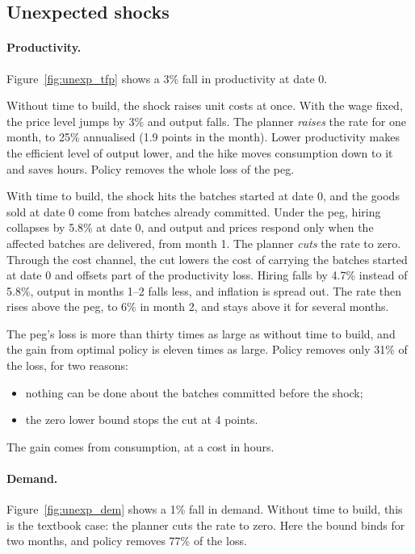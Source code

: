 \documentclass[11pt]{article}
\theoremstyle{definition}
\begin{document}
\subsection{Unexpected shocks}\label{sec:unexp}

\paragraph{Productivity.} Figure~\ref{fig:unexp_tfp} shows a 3\% fall in productivity at date 0.

Without time to build, the shock raises unit costs at once. With the wage fixed, the price level jumps
by 3\% and output falls. The planner \emph{raises} the rate for one month, to 25\% annualised (1.9
points in the month). Lower productivity makes the efficient level of output lower, and the hike moves
consumption down to it and saves hours. Policy removes the whole loss of the peg.

With time to build, the shock hits the batches started at date 0, and the goods sold at date 0 come
from batches already committed. Under the peg, hiring collapses by 5.8\% at date 0, and output and
prices respond only when the affected batches are delivered, from month 1. The planner \emph{cuts}
the rate to zero. Through the cost channel, the cut lowers the cost of carrying the batches started
at date 0 and offsets part of the productivity loss. Hiring falls by 4.7\% instead of 5.8\%, output in
months 1--2 falls less, and inflation is spread out. The rate then rises above the peg, to 6\% in
month 2, and stays above it for several months.

The peg's loss is more than thirty times as large as without time to build, and the gain from optimal
policy is eleven times as large. Policy removes only 31\% of the loss, for two reasons:
\begin{itemize}
  \item nothing can be done about the batches committed before the shock;
  \item the zero lower bound stops the cut at 4 points.
\end{itemize}
The gain comes from consumption, at a cost in hours.

\paragraph{Demand.} Figure~\ref{fig:unexp_dem} shows a 1\% fall in demand. Without time to build,
this is the textbook case: the planner cuts the rate to zero. Here the bound binds for two months, and
policy removes 77\% of the loss.
\end{document}
